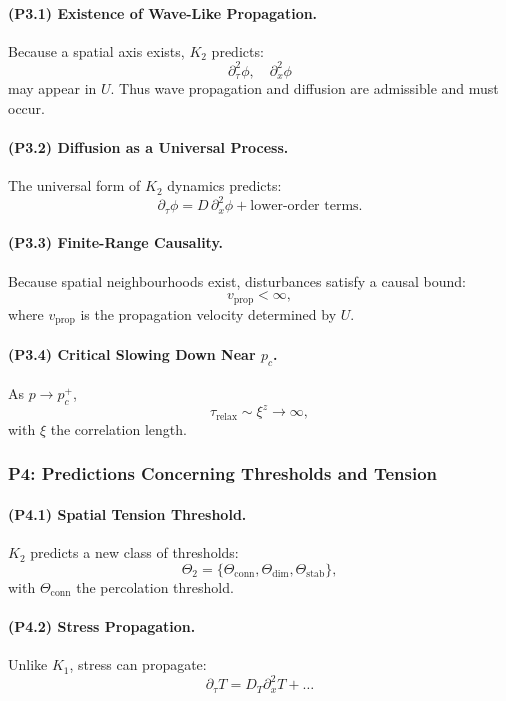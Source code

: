 \paragraph{(P3.1) Existence of Wave-Like Propagation.}
Because a spatial axis exists, $K_2$ predicts:
\[
\partial_\tau^2 \phi, \quad \partial_x^2 \phi
\]
may appear in $U$.
Thus wave propagation and diffusion are admissible and must occur.

\paragraph{(P3.2) Diffusion as a Universal Process.}
The universal form of $K_2$ dynamics predicts:
\[
\partial_\tau \phi = D\, \partial_x^2\phi + \text{lower-order terms}.
\]

\paragraph{(P3.3) Finite-Range Causality.}
Because spatial neighbourhoods exist, disturbances satisfy a causal bound:
\[
v_{\mathrm{prop}} < \infty,
\]
where $v_{\mathrm{prop}}$ is the propagation velocity determined by $U$.

\paragraph{(P3.4) Critical Slowing Down Near \texorpdfstring{$p_c$}{p_c}.}
As $p \to p_c^+$,
\[
\tau_{\mathrm{relax}} \sim \xi^z \to \infty,
\]
with $\xi$ the correlation length.

\subsubsection{P4: Predictions Concerning Thresholds and Tension}

\paragraph{(P4.1) Spatial Tension Threshold.}
$K_2$ predicts a new class of thresholds:
\[
\Theta_2 = \{\Theta_{\mathrm{conn}}, \Theta_{\mathrm{dim}}, 
\Theta_{\mathrm{stab}}\},
\]
with $\Theta_{\mathrm{conn}}$ the percolation threshold.

\paragraph{(P4.2) Stress Propagation.}
Unlike $K_1$, stress can propagate:
\[
\partial_\tau T = D_T \partial_x^2 T + \ldots
\]

